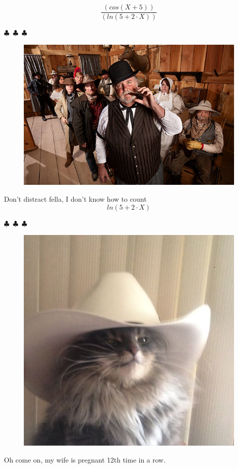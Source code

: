 \documentclass{article}
\begin{document}
\begin{equation}
{\frac{({cos({{X}+{5}})})}{({ln({{5}+{{2}\cdot{X}}})})}}
\end{equation}
\begin{center} $\clubsuit$~$\clubsuit$~$\clubsuit$ \end{center}\begin{figure}[H] \includegraphics[scale=1.4]{funny_pics/funny_bartender.jpg} \end{figure} Don't distract fella, I don't know how to count
\begin{equation}
{ln({{5}+{{2}\cdot{X}}})}
\end{equation}
\begin{center} $\clubsuit$~$\clubsuit$~$\clubsuit$ \end{center}\begin{figure}[H] \includegraphics[scale=0.3]{funny_pics/cowboy_cat.jpg} \end{figure}Oh come on, my wife is pregnant 12th time in a row.
\end{document}
